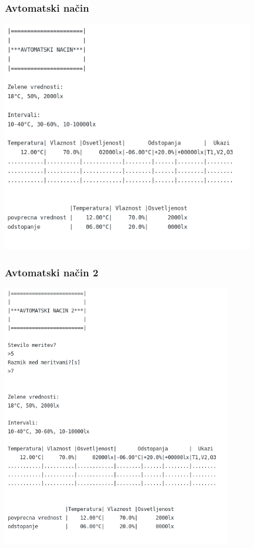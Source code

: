 \documentclass[a4paper,12pt]{article}
\begin{document}
			\subsubsection{Avtomatski način}

				\includegraphics[width=11cm]{diagrami_slike/avt_nac.png}

\newpage

			\subsubsection{Avtomatski način 2}

				\includegraphics[width=10cm]{diagrami_slike/avt_nac2.png}
\end{document}

